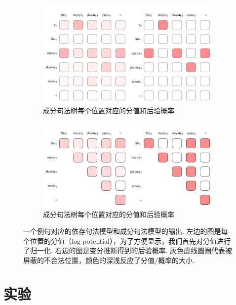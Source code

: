 \begin{figure}[tb]
    \centering
    \begin{subfigure}[b]{0.9\textwidth}
        \centering
        \includegraphics[scale=0.75]{figures/dep-probs.pdf}
        \caption{成分句法树每个位置对应的分值和后验概率}
        \label{fig:dep-probs}
    \end{subfigure}
    \begin{subfigure}[b]{0.9\textwidth}
        \centering
        \includegraphics[scale=0.75]{figures/con-probs.pdf}
        \caption{成分句法树每个位置对应的分值和后验概率}
        \label{fig:con-probs}
    \end{subfigure}
    \caption{一个例句对应的依存句法模型和成分句法模型的输出. 左边的图是每个位置的分值（log potential），为了方便显示，我们首先对分值进行了归一化.
        右边的图是变分推断得到的后验概率. 灰色虚线圆圈代表被屏蔽的不合法位置，颜色的深浅反应了分值/概率的大小.}

    \label{fig:vi-probs}
\end{figure}

\section{实验}\label{sec:vi-exp}


